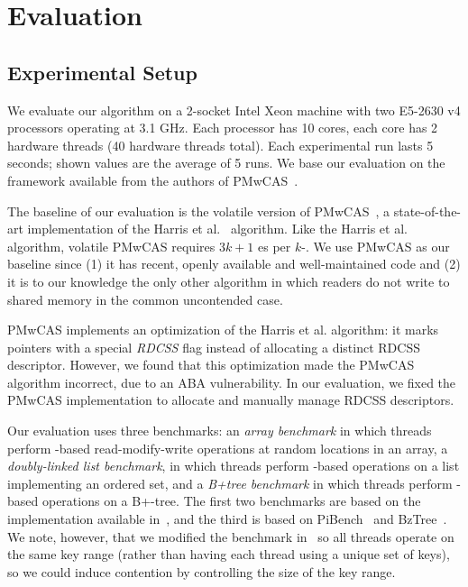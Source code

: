 \section{Evaluation}\label{sec:eval}


\subsection{Experimental Setup}

We evaluate our algorithm on a 2-socket Intel Xeon machine with two E5-2630 v4 processors operating at 3.1 GHz. Each processor has 10 cores, each core has 2 hardware threads (40 hardware threads total). Each experimental run lasts 5 seconds; shown values are the average of 5 runs. We base our evaluation on the framework available from the authors of PMwCAS~\cite{pmwcascode,wang18}.

The baseline of our evaluation is the volatile version of PMwCAS~\cite{pmwcascode,wang18}, a state-of-the-art implementation of the Harris et al.~\cite{harris02} algorithm. Like the Harris et al. algorithm, volatile PMwCAS requires $3k+1$ \cas{}es per $k$-\cas{}. We use PMwCAS as our baseline since (1) it has recent, openly available and well-maintained code and (2) it is to our knowledge the only other \mcas{} algorithm in which readers do not write to shared memory in the common uncontended case.

PMwCAS implements an optimization of the Harris et al. algorithm: it marks pointers with a special \textit{RDCSS} flag instead of allocating a distinct RDCSS descriptor. However, we found that this optimization made the PMwCAS algorithm incorrect, due to an ABA vulnerability. In our evaluation, we fixed the PMwCAS implementation to allocate and manually manage RDCSS descriptors.

Our evaluation uses three benchmarks: an \textit{array benchmark} in which threads perform \mcas{}-based read-modify-write operations at random locations in an array, a \textit{doubly-linked list benchmark}, in which threads perform \mcas{}-based operations on a list implementing an ordered set, and a \textit{B+tree benchmark} in which threads perform \mcas{}-based operations on a B+-tree. The first two benchmarks are based on the implementation available in~\cite{pmwcascode}, and the third is based on PiBench~\cite{pibencode} and BzTree~\cite{arulraj18,bztreecode}. We note, however, that we modified the
benchmark in~\cite{pmwcascode} so all threads operate on the same key range (rather than having each thread using a unique set of keys), so we could induce contention by controlling the size of the key range.

